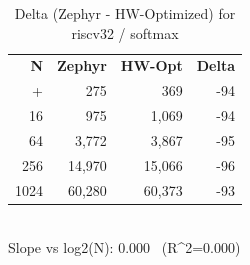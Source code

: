 \begin{table}[tb]
    \centering
    \caption{Delta (Zephyr - HW-Optimized) for riscv32 / softmax}
    \label{tab:delta_riscv32_softmax}
    \scriptsize
    \begin{tabular}{r r r r}
        \hline
        \textbf{N} & \textbf{Zephyr} & \textbf{HW-Opt} & \textbf{Delta} \\\n+        \hline
        4 & 275 & 369 & -94\\
        16 & 975 & 1,069 & -94\\
        64 & 3,772 & 3,867 & -95\\
        256 & 14,970 & 15,066 & -96\\
        1024 & 60,280 & 60,373 & -93\\
        \hline
    \end{tabular}
    \vspace{2mm}\\\n    Slope vs log2(N): 0.000 \ (R^2=0.000)\n\end{table}
